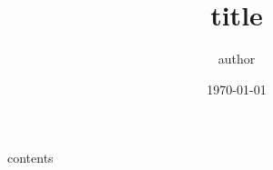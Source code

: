\documentclass[12pt,letterpaper,oneside]{memoir}
\title{ {{ title }} }
\author{ {{ author }} }
\date{\today}
\begin{document}
  \maketitle

  {{ contents }}
\end{document}
